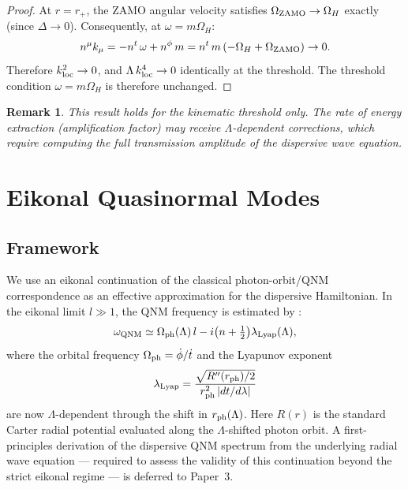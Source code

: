 \documentclass[12pt,a4paper]{article}
\newtheorem{remark}{Remark}
\newcommand{\kloc}{k_{\rm loc}}
\newcommand{\OmH}{\Omega_H}
\newcommand{\Omph}{\Omega_{\rm ph}}
\newcommand{\lLyap}{\lambda_{\rm Lyap}}
\begin{document}
\begin{proof}
At $r=r_+$, the ZAMO angular velocity satisfies
$\Omega_{\rm ZAMO}\to\OmH$ exactly (since $\Delta\to 0$).
Consequently, at $\omega=m\OmH$:
\begin{equation}
  n^\mu k_\mu = -n^t\,\omega + n^\phi\,m
    = n^t\,m\,(-\OmH + \Omega_{\rm ZAMO}) \to 0.
\end{equation}
Therefore $\kloc^2\to 0$, and $\Lambda\,\kloc^4\to 0$ identically at
the threshold.
The threshold condition $\omega=m\OmH$ is therefore unchanged.
\end{proof}

\begin{remark}
This result holds for the kinematic threshold only.
The rate of energy extraction (amplification factor) may receive
$\Lambda$-dependent corrections, which require computing the
full transmission amplitude of the dispersive wave equation.
\end{remark}

\section{Eikonal Quasinormal Modes}
\label{sec:qnm}

\subsection{Framework}

We use an eikonal continuation of the classical photon-orbit/QNM
correspondence as an effective approximation for the dispersive
Hamiltonian. In the eikonal limit $l\gg 1$, the QNM frequency is
estimated by \citep{Mashhoon1985,Cardoso2009}:
\begin{equation}\label{eq:qnm}
  \omega_{\rm QNM} \simeq \Omph(\Lambda)\,l
    - i\bigl(n+\tfrac{1}{2}\bigr)\lLyap(\Lambda),
\end{equation}
where the orbital frequency $\Omph=\dot\phi/\dot t$ and the
Lyapunov exponent
\begin{equation}
  \lLyap = \frac{\sqrt{R''(r_{\rm ph})/2}}{r_{\rm ph}^2\,|dt/d\lambda|}
\end{equation}
are now $\Lambda$-dependent through the shift in $r_{\rm ph}(\Lambda)$.
Here $R(r)$ is the standard Carter radial potential evaluated along the
$\Lambda$-shifted photon orbit. A first-principles derivation of the
dispersive QNM spectrum from the underlying radial wave equation ---
required to assess the validity of this continuation beyond the
strict eikonal regime --- is deferred to Paper~3.
\end{document}

